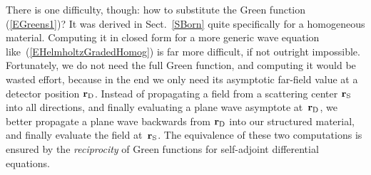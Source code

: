 There is one difficulty, though:
how to substitute the Green function (\ref{EGreens1})?
It was derived in Sect.~\ref{SBorn} quite specifically
for a homogeneous material.
Computing it in closed form for a more generic wave equation
like~(\ref{EHelmholtzGradedHomog}) is far more difficult,
if not outright impossible.
Fortunately, we do not need the full Green function,
and computing it would be wasted effort,
because in the end
we only need its asymptotic far-field value at a detector position $\mathbf{r}_\text{D}$.
Instead of propagating a field from a scattering center $\mathbf{r}_\text{S}$
into all directions, and finally evaluating a plane wave asymptote at~$\mathbf{r}_\text{D}$,
we better propagate a plane wave backwards from $\mathbf{r}_\text{D}$
into our structured material,
and finally evaluate the field at~$\mathbf{r}_\text{S}$.
The equivalence of these two computations is ensured
by the \textit{reciprocity}%
of Green functions for self-adjoint differential equations.

